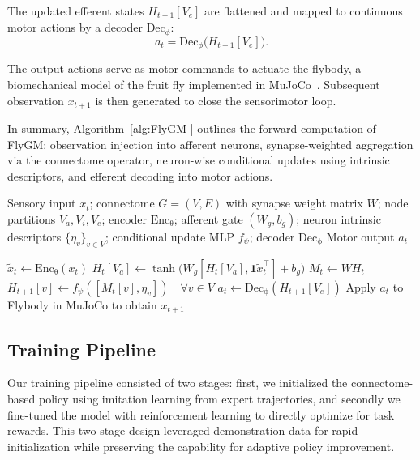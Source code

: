 \documentclass{article}
\theoremstyle{plain}
\theoremstyle{definition}
\theoremstyle{remark}
\begin{document}
The updated efferent states $H_{t+1}[V_e]$ are flattened and mapped to continuous motor actions by a decoder $\mathrm{Dec}_\phi$:
\begin{equation}
a_t = \mathrm{Dec}_\phi\!\big(H_{t+1}[V_e]\big).
\end{equation}

The output actions serve as motor commands to actuate the flybody, a biomechanical model of the fruit fly implemented in MuJoCo~\citep{Vaxenburg2025}. Subsequent observation $x_{t+1}$ is then generated to close the sensorimotor loop.

In summary, Algorithm~\ref{alg:FlyGM } outlines the forward computation of FlyGM: observation injection into afferent neurons, synapse-weighted aggregation via the connectome operator, neuron-wise conditional updates using intrinsic descriptors, and efferent decoding into motor actions.

\begin{algorithm}[tb]
  \caption{Fly-connectomic Graph Model (FlyGM)}
  \label{alg:FlyGM }
  \begin{algorithmic}[1]
     Sensory input $x_t$; connectome $G=(V,E)$ with synapse weight matrix $W$; node partitions $V_a, V_i, V_e$;
    encoder $\mathrm{Enc_\theta}$; afferent gate $(W_g,b_g)$; neuron intrinsic descriptors $\{\eta_v\}_{v\in V}$;
    conditional update MLP $f_\psi$; decoder $\mathrm{Dec_\phi}$
     Motor output $a_t$

      \STATE $\tilde{x}_t \gets \mathrm{Enc_\theta}(x_t)$
      \STATE $H_t[V_a] \gets \tanh\!\big(W_g [H_t[V_a], \mathbf{1}\tilde{x}_t^\top] + b_g\big)$
      \STATE $M_t \gets W H_t$
      \STATE $H_{t+1}[v] \gets f_\psi([M_t[v], \eta_v]) \quad \forall v\in V$
      \STATE $a_t \gets \mathrm{Dec_\phi}(H_{t+1}[V_e])$
      \STATE Apply $a_t$ to Flybody in MuJoCo to obtain $x_{t+1}$
    \ENDFOR
  \end{algorithmic}
\end{algorithm}

\subsection{Training Pipeline}

Our training pipeline consisted of two stages: first, we initialized the connectome-based policy using imitation learning from expert trajectories, and secondly we fine-tuned the model with reinforcement learning to directly optimize for task rewards. This two-stage design leveraged demonstration data for rapid initialization while preserving the capability for adaptive policy improvement.
\end{document}
